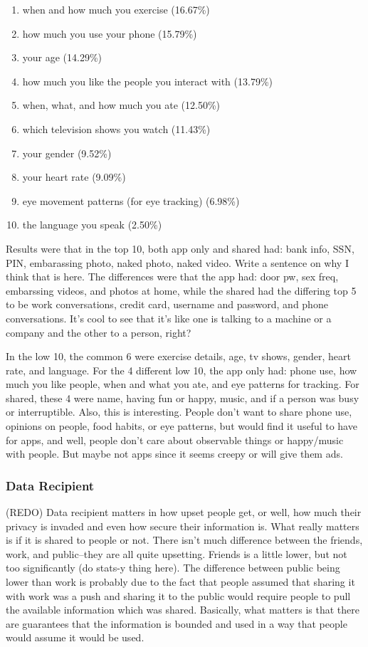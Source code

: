 \documentclass{acm_proc_article-sp}
\begin{document}
\begin{enumerate} \itemsep1pt \parskip0pt 
  \setcounter{enumi}{63}
  \item when and how much you exercise (16.67\%)
  \item how much you use your phone (15.79\%)
  \item your age (14.29\%)
  \item how much you like the people you interact with (13.79\%)
  \item when, what, and how much you ate (12.50\%)
  \item which television shows you watch (11.43\%)
  \item your gender (9.52\%)
  \item your heart rate (9.09\%)
  \item eye movement patterns (for eye tracking) (6.98\%)
  \item the language you speak (2.50\%)\\[-.8cm]
\end{enumerate}

Results were that in the top 10, both app only and shared had: bank info, SSN, PIN, embarassing photo, naked photo, naked video. Write a sentence on why I think that is here. The differences were that the app had: door pw, sex freq, embarssing videos, and photos at home, while the shared had the differing top 5 to be work conversations, credit card, username and password,  and phone conversations. It's cool to see that it's like one is talking to a machine or a company and the other to a person, right? 

In the low 10, the common 6 were exercise details, age, tv shows, gender, heart rate, and language. For the 4 different low 10, the app only had: phone use, how much you like people, when and what you ate, and eye patterns for tracking. For shared, these 4 were name, having fun or happy, music, and if a person was busy or interruptible. Also, this is interesting. People don't want to share phone use, opinions on people, food habits, or eye patterns, but would find it useful to have for apps, and well, people don't care about observable things or happy/music with people. But maybe not apps since it seems creepy or will give them ads.

\subsubsection{Data Recipient}
(REDO) Data recipient matters in how upset people get, or well, how much their privacy is invaded and even how secure their information is. What really matters is if it is shared to people or not. There isn't much difference between the friends, work, and public--they are all quite upsetting. Friends is a little lower, but not too significantly (do stats-y thing here). The difference between public being lower than work is probably due to the fact that people assumed that sharing it with work was a push and sharing it to the public would require people to pull the available information which was shared. Basically, what matters is that there are guarantees that the information is bounded and used in a way that people would assume it would be used.
\end{document}
